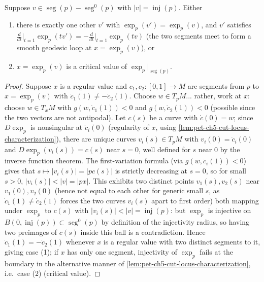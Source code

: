 \begin{lemma}
  \label{lem:pet-ch5-klingenberg}
  Suppose $v\in\operatorname{seg}(p)-\operatorname{seg}^0(p)$ with
  $|v|=\operatorname{inj}(p)$. Either
  \begin{enumerate}
  \item[(1)] there is exactly one other $v'$ with $\exp_p(v')=\exp_p(v)$, and $v'$
  satisfies $\frac{d}{dt}\big|_{t=1}\exp_p(tv')=-\frac{d}{dt}\big|_{t=1}\exp_p(tv)$
  (the two segments meet to form a smooth geodesic loop at $x=\exp_p(v)$), or
  \item[(2)] $x=\exp_p(v)$ is a critical value of $\exp_p|_{\operatorname{seg}(p)}$.
  \end{enumerate}
\end{lemma}
\begin{proof}
  Suppose $x$ is a regular value and $c_1,c_2:[0,1]\to M$ are segments from $p$ to
  $x=\exp_p(v)$ with $\dot c_1(1)\ne-\dot c_2(1)$. Choose $w\in T_pM$... rather,
  work at $x$: choose $w\in T_xM$ with $g(w,\dot c_1(1))<0$ and $g(w,\dot c_2(1))<0$
  (possible since the two vectors are not antipodal). Let $c(s)$ be a curve with
  $\dot c(0)=w$; since $D\exp_p$ is nonsingular at $\dot c_i(0)$ (regularity of $x$,
  using \cref{lem:pet-ch5-cut-locus-characterization}), there are unique curves
  $v_i(s)\in T_pM$ with $v_i(0)=\dot c_i(0)$ and $D\exp_p(v_i(s))=c(s)$ near
  $s=0$, well defined for $s$ near $0$ by the inverse function theorem. The
  first-variation formula (via $g(w,\dot c_i(1))<0$) gives that
  $s\mapsto|v_i(s)|=|pc(s)|$ is strictly decreasing at $s=0$, so for small $s>0$,
  $|v_i(s)|<|v|=|px|$. This exhibits two distinct points $v_1(s),v_2(s)$ near
  $v_1(0),v_2(0)$ (hence not equal to each other for generic small $s$, as
  $\dot c_1(1)\ne\dot c_2(1)$ forces the two curves $v_i(s)$ apart to first order)
  both mapping under $\exp_p$ to $c(s)$ with $|v_i(s)|<|v|=\operatorname{inj}(p)$: but
  $\exp_p$ is injective on $B(0,\operatorname{inj}(p))\subset\operatorname{seg}^0(p)$
  by definition of the injectivity radius, so having two preimages of $c(s)$ inside
  this ball is a contradiction. Hence $\dot c_1(1)=-\dot c_2(1)$ whenever $x$ is a
  regular value with two distinct segments to it, giving case (1); if $x$ has only
  one segment, injectivity of $\exp_p$ fails at the boundary in the alternative
  manner of \cref{lem:pet-ch5-cut-locus-characterization}, i.e.\ case (2) (critical
  value).
\end{proof}


